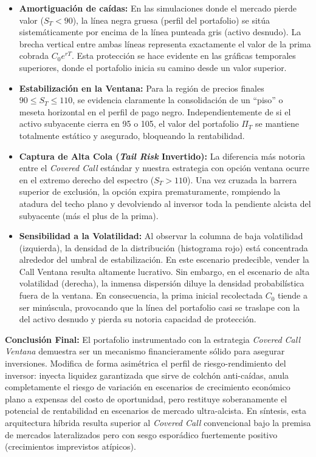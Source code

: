 \documentclass[12pt]{article}
\begin{document}
\begin{itemize}
    \item \textbf{Amortiguación de caídas:} En las simulaciones donde el mercado pierde valor ($S_T < 90$), la línea negra gruesa (perfil del portafolio) se sitúa sistemáticamente por encima de la línea punteada gris (activo desnudo). La brecha vertical entre ambas líneas representa exactamente el valor de la prima cobrada $C_0 e^{rT}$. Esta protección se hace evidente en las gráficas temporales superiores, donde el portafolio inicia su camino desde un valor superior.
    \item \textbf{Estabilización en la Ventana:} Para la región de precios finales $90 \leq S_T \leq 110$, se evidencia claramente la consolidación de un ``piso'' o meseta horizontal en el perfil de pago negro. Independientemente de si el activo subyacente cierra en 95 o 105, el valor del portafolio $\Pi_T$ se mantiene totalmente estático y asegurado, bloqueando la rentabilidad.
    \item \textbf{Captura de Alta Cola (\textit{Tail Risk} Invertido):} La diferencia más notoria entre el \textit{Covered Call} estándar y nuestra estrategia con opción ventana ocurre en el extremo derecho del espectro ($S_T > 110$). Una vez cruzada la barrera superior de exclusión, la opción expira prematuramente, rompiendo la atadura del techo plano y devolviendo al inversor toda la pendiente alcista del subyacente (más el plus de la prima).
    \item \textbf{Sensibilidad a la Volatilidad:} Al observar la columna de baja volatilidad (izquierda), la densidad de la distribución (histograma rojo) está concentrada alrededor del umbral de estabilización. En este escenario predecible, vender la Call Ventana resulta altamente lucrativo. Sin embargo, en el escenario de alta volatilidad (derecha), la inmensa dispersión diluye la densidad probabilística fuera de la ventana. En consecuencia, la prima inicial recolectada $C_0$ tiende a ser minúscula, provocando que la línea del portafolio casi se traslape con la del activo desnudo y pierda su notoria capacidad de protección.
\end{itemize}

\textbf{Conclusión Final:} El portafolio instrumentado con la estrategia \textit{Covered Call Ventana} demuestra ser un mecanismo financieramente sólido para asegurar inversiones. Modifica de forma asimétrica el perfil de riesgo-rendimiento del inversor: inyecta liquidez garantizada que sirve de colchón anti-caídas, anula completamente el riesgo de variación en escenarios de crecimiento económico plano a expensas del costo de oportunidad, pero restituye soberanamente el potencial de rentabilidad en escenarios de mercado ultra-alcista. En síntesis, esta arquitectura híbrida resulta superior al \textit{Covered Call} convencional bajo la premisa de mercados lateralizados pero con sesgo esporádico fuertemente positivo (crecimientos imprevistos atípicos).
\end{document}

